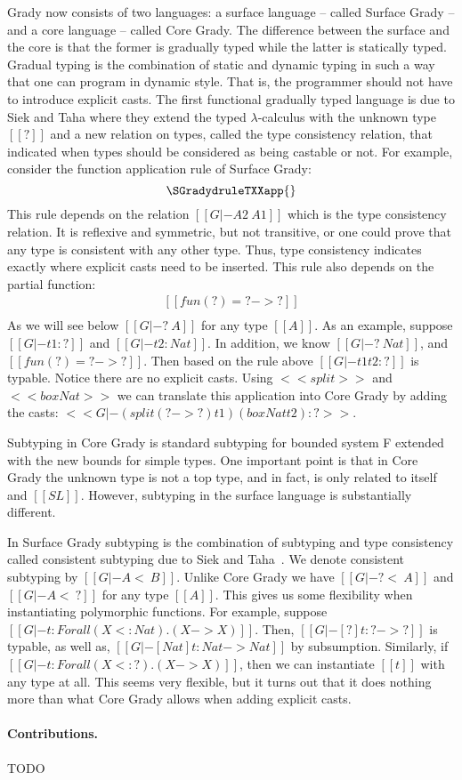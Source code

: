 Grady now consists of two languages: a surface language -- called
Surface Grady -- and a core language -- called Core Grady. The
difference between the surface and the core is that the former is
gradually typed while the latter is statically typed. Gradual typing
is the combination of static and dynamic typing in such a way that one
can program in dynamic style.  That is, the programmer should not have
to introduce explicit casts. The first functional gradually typed
language is due to Siek and Taha \cite{Siek:2006} where they extend
the typed $\lambda$-calculus with the unknown type $[[?]]$ and a new
relation on types, called the type consistency relation, that indicated
when types should be considered as being castable or not.  For
example, consider the function application rule of Surface Grady:
\[
\SGradydruleTXXapp{}
\]
This rule depends on the relation $[[G |- A2 ~ A1]]$ which is the type
consistency relation.  It is reflexive and symmetric, but not
transitive, or one could prove that any type is consistent with any
other type.  Thus, type consistency indicates exactly where explicit
casts need to be inserted.  This rule also depends on the partial
function:
\[
\begin{array}{lll}
  [[fun(?) = ? -> ?]]\\
  [[fun(A1 -> B1) = A1 -> B1]]
\end{array}
\]
As we will see below $[[G |- ? ~ A]]$ for any type $[[A]]$.  As an
example, suppose $[[G |- t1 : ?]]$ and $[[G |- t2 : Nat]]$.  In addition, we know
$[[G |- ? ~ Nat]]$, and $[[fun(?) = ? -> ?]]$.
Then
based on the rule above $[[G |- t1 t2 : ?]]$ is typable.  Notice
there are no explicit casts.  Using $<<split>>$ and $<<box Nat>>$ we
can translate this application into Core Grady by adding the casts:
$<<G |- (split (? -> ?) t1) (box Nat t2) : ?>>$.

Subtyping in Core Grady is standard subtyping for bounded system F
extended with the new bounds for simple types.  One important point is
that in Core Grady the unknown type is not a top type, and in fact, is
only related to itself and $[[SL]]$.  However, subtyping in the
surface language is substantially different.

In Surface Grady subtyping is the combination of subtyping and type
consistency called consistent subtyping due to
Siek and Taha~\cite{Siek:2007}.  We denote consistent subtyping by $[[G |-
    A <~ B]]$.  Unlike Core Grady we have $[[G |- ? <~ A]]$ and $[[G
    |- A <~ ?]]$ for any type $[[A]]$.  This gives us some flexibility
when instantiating polymorphic functions.  For example, suppose $[[G
    |- t : Forall (X <: Nat).(X -> X)]]$.  Then, $[[G |- [?]t : ? ->
    ?]]$ is typable, as well as, $[[G |- [Nat]t : Nat -> Nat]]$ by
subsumption.  Similarly, if $[[G |- t : Forall (X <: ?).(X -> X)]]$,
then we can instantiate $[[t]]$ with any type at all.  This seems very
flexible, but it turns out that it does nothing more than what Core
Grady allows when adding explicit casts.

\paragraph{Contributions.} TODO

